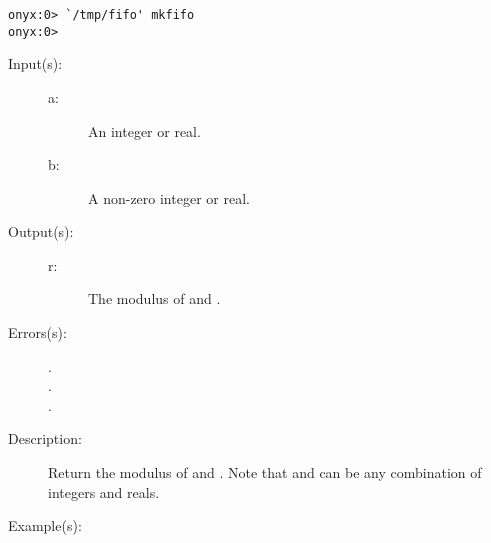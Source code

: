 \begin{description}
\begin{description}
\begin{verbatim}
onyx:0> `/tmp/fifo' mkfifo
onyx:0>
		\end{verbatim}
	\end{description}
\label{systemdict:mod}
\item[{\onyxop{a b}{mod}{r}}: ]
	\begin{description}\item[]
	\item[Input(s): ]
		\begin{description}\item[]
		\item[a: ]
			An integer or real.
		\item[b: ]
			A non-zero integer or real.
		\end{description}
	\item[Output(s): ]
		\begin{description}\item[]
		\item[r: ]
			The modulus of  and .
		\end{description}
	\item[Errors(s): ]
		\begin{description}\item[]
		\item[.]
		\item[.]
		\item[.]
		\end{description}
	\item[Description: ]
			Return the modulus of  and .  Note
			that  and  can be any combination of
			integers and reals.
	\item[Example(s): ]\begin{verbatim}


\end{verbatim}
\end{description}
\end{description}

